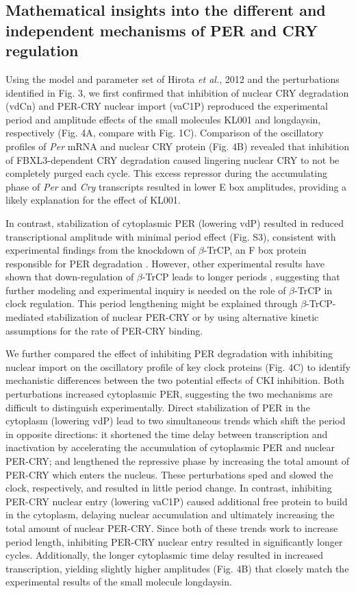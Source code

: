 \subsection{Mathematical insights into the different and independent mechanisms
of PER and CRY regulation}
Using the model and parameter set of Hirota {\it et al.}, 2012
\cite{Hirota2012} and the perturbations identified in Fig. 3, we first
confirmed that inhibition of nuclear CRY degradation (vdCn) and PER-CRY nuclear
import (vaC1P) reproduced the experimental period and amplitude effects of the
small molecules KL001 and longdaysin, respectively (Fig.  4A, compare with Fig.
1C). Comparison of the oscillatory profiles of {\it Per} mRNA and nuclear CRY
protein (Fig. 4B) revealed that inhibition of FBXL3-dependent CRY degradation
caused lingering nuclear CRY to not be completely purged each cycle.  This
excess repressor during the accumulating phase of {\it Per} and {\it Cry}
transcripts resulted in lower E box amplitudes, providing a likely explanation
for the effect of KL001.

In contrast, stabilization of cytoplasmic PER (lowering vdP) resulted in reduced
transcriptional amplitude with minimal period effect (Fig. S3), consistent with
experimental findings from the knockdown of $\beta$-TrCP, an F box protein
responsible for PER degradation \cite{Ohsaki2008}. However, other experimental
results have shown that down-regulation of $\beta$-TrCP leads to longer periods
\cite{Reischl2007}, suggesting that further modeling and experimental inquiry is
needed on the role of $\beta$-TrCP in clock regulation. This period lengthening
might be explained through $\beta$-TrCP-mediated stabilization of nuclear
PER-CRY or by using alternative kinetic assumptions for the rate of PER-CRY
binding. 

We further compared the effect of inhibiting PER degradation with inhibiting
nuclear import on the oscillatory profile of key clock proteins (Fig. 4C) to
identify mechanistic differences between the two potential effects of CKI
inhibition. Both perturbations increased cytoplasmic PER, suggesting the two
mechanisms are difficult to distinguish experimentally. Direct stabilization of
PER in the cytoplasm (lowering vdP) lead to two simultaneous trends which shift
the period in opposite directions: it shortened the time delay between
transcription and inactivation by accelerating the accumulation of cytoplasmic
PER and nuclear PER-CRY; and lengthened the repressive phase by increasing the
total amount of PER-CRY which enters the nucleus. These perturbations sped and
slowed the clock, respectively, and resulted in little period change. In
contrast, inhibiting PER-CRY nuclear entry (lowering vaC1P) caused additional
free protein to build in the cytoplasm, delaying nuclear accumulation and
ultimately increasing the total amount of nuclear PER-CRY. Since both of these
trends work to increase period length, inhibiting PER-CRY nuclear entry
resulted in significantly longer cycles. Additionally, the longer cytoplasmic
time delay resulted in increased transcription, yielding slightly higher
amplitudes (Fig. 4B) that closely match the experimental results of the small
molecule longdaysin.

